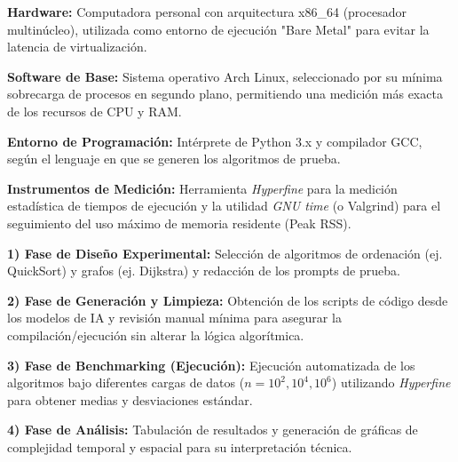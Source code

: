 \begin{listaIII}
    \item \textbf{Hardware:} Computadora personal con arquitectura x86\_64 (procesador multinúcleo), utilizada como entorno de ejecución "Bare Metal" para evitar la latencia de virtualización.
    \item \textbf{Software de Base:} Sistema operativo Arch Linux, seleccionado por su mínima sobrecarga de procesos en segundo plano, permitiendo una medición más exacta de los recursos de CPU y RAM.
    \item \textbf{Entorno de Programación:} Intérprete de Python 3.x y compilador GCC, según el lenguaje en que se generen los algoritmos de prueba.
    \item \textbf{Instrumentos de Medición:} Herramienta \textit{Hyperfine} para la medición estadística de tiempos de ejecución y la utilidad \textit{GNU time} (o Valgrind) para el seguimiento del uso máximo de memoria residente (Peak RSS).
\end{listaIII}

\begin{listaIII}
    \item \textbf{1) Fase de Diseño Experimental:} Selección de algoritmos de ordenación (ej. QuickSort) y grafos (ej. Dijkstra) y redacción de los prompts de prueba.
    \item \textbf{2) Fase de Generación y Limpieza:} Obtención de los scripts de código desde los modelos de IA y revisión manual mínima para asegurar la compilación/ejecución sin alterar la lógica algorítmica.
    \item \textbf{3) Fase de Benchmarking (Ejecución):} Ejecución automatizada de los algoritmos bajo diferentes cargas de datos ($n=10^2, 10^4, 10^6$) utilizando \textit{Hyperfine} para obtener medias y desviaciones estándar.
    \item \textbf{4) Fase de Análisis:} Tabulación de resultados y generación de gráficas de complejidad temporal y espacial para su interpretación técnica.
\end{listaIII}